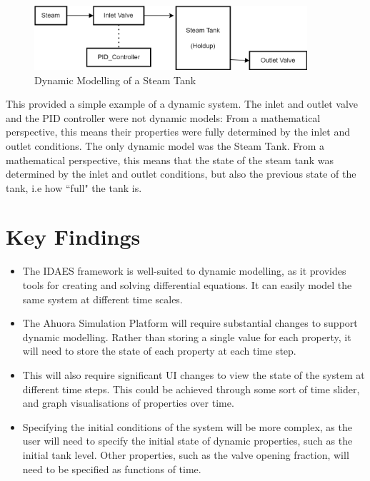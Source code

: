 \documentclass[12pt]{report}
\begin{document}
\begin{figure}
    \includegraphics[width=0.9\textwidth]{dynamicmodelling.png}
    \caption{Dynamic Modelling of a Steam Tank}
    \label{fig:dynamicmodelling}
\end{figure}

This provided a simple example of a dynamic system. The inlet and outlet valve and the PID controller were not dynamic models: From a mathematical perspective, this means their properties were fully determined by the inlet and outlet conditions. The only dynamic model was the Steam Tank. From a mathematical perspective, this means that the state of the steam tank was determined by the inlet and outlet conditions, but also the previous state of the tank, i.e how ``full" the tank is.


\section{Key Findings}

\begin{itemize}
    \item The IDAES framework is well-suited to dynamic modelling, as it provides tools for creating and solving differential equations. It can easily model the same system at different time scales.
    \item The Ahuora Simulation Platform will require substantial changes to support dynamic modelling. Rather than storing a single value for each property, it will need to store the state of each property at each time step.
    \item This will also require significant UI changes to view the state of the system at different time steps. This could be achieved through some sort of time slider, and graph visualisations of properties over time.
    \item Specifying the initial conditions of the system will be more complex, as the user will need to specify the initial state of dynamic properties, such as the initial tank level. Other properties, such as the valve opening fraction, will need to be specified as functions of time.
\end{itemize}
\end{document}
